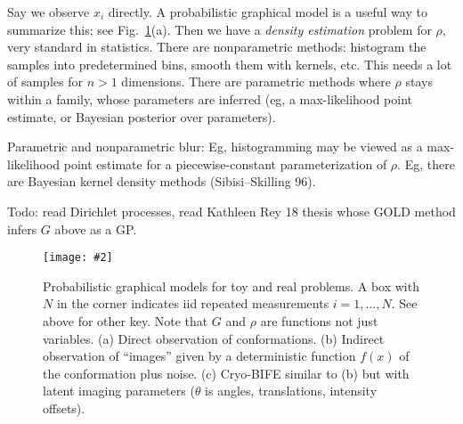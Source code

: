 \documentclass[10pt]{article}
\newcommand{\bfi}{\begin{figure}}
\newcommand{\efi}{\end{figure}}
\newcommand{\ca}[2]{\caption{#1 \label{#2}}}
\newcommand{\ig}[2]{\texttt{[image: \#2]}}
\begin{document}
Say we observe $x_i$ directly.
A probabilistic graphical model is a useful way to summarize this;
see Fig.~\ref{f:graphs}(a).
Then we have a {\em density estimation} problem for $\rho$,
very standard in statistics.
There are nonparametric methods: histogram the samples into predetermined bins,
smooth them with kernels, etc.
This needs a lot of samples for $n>1$ dimensions.
There are parametric methods where $\rho$ stays within
a family, whose parameters are inferred (eg, a max-likelihood
point estimate, or Bayesian posterior over parameters).

Parametric and nonparametric blur:
Eg, histogramming may be viewed as a max-likelihood point estimate
for a piecewise-constant parameterization of $\rho$.
Eg, there are Bayesian kernel density methods (Sibisi--Skilling 96).

Todo: read Dirichlet processes,
read Kathleen Rey 18 thesis whose GOLD method infers $G$ above
as a GP.



\bfi[t]
\ig{width=6in}{graphs}
\ca{Probabilistic graphical models for toy and real problems.
  A box with $N$ in the corner indicates iid repeated measurements
  $i=1,\dots,N$. See above for other key.
  Note that $G$ and $\rho$ are functions not just variables.
  (a) Direct observation of conformations. (b) Indirect observation
  of ``images'' given by a deterministic function $f(x)$ of the conformation
  plus noise. (c) Cryo-BIFE similar to (b) but with latent imaging parameters
  ($\theta$ is angles, translations, intensity offsets).
  }{f:graphs}
\efi










\end{document}
